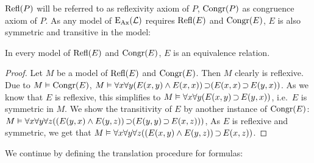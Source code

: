 $\operatorname{Refl}(P)$ will be referred to as reflexivity axiom of $P$, $\operatorname{Congr}(P)$ as congruence axiom of $P$.
As any model of $\operatorname{E_{Ax}}(\operatorname{\mathcal{L}})$ requires $\operatorname{Refl}(E)$ and $\operatorname{Congr}(E)$, $E$ is also symmetric and transitive in the model:

\begin{prop}
	\label{prop:equivalence_relation}
	In every model of $\operatorname{Refl}(E)$ and $\operatorname{Congr}(E)$,
	$E$ is an equivalence relation.
\end{prop}
\begin{proof}
	Let $M$ be a model of $\operatorname{Refl}(E)$ and $\operatorname{Congr}(E)$.
	Then $M$ clearly is reflexive.
	Due to $M \vDash \operatorname{Congr}(E)$,
	$M \entails \forall x \forall y (E(x, y) \land E(x, x)) \limpl ( E(x, x) \limpl\nolinebreak E(y, x))$.
	As we know that $E$ is reflexive, this simplifies to
	$M \entails \forall x \forall y (E(x, y)\limpl\nolinebreak E(y, x))$, i.e.~$E$ is symmetric in $M$.
	We show the transitivity of $E$ by another instance of $\operatorname{Congr}(E)$: 
	$M \entails \forall x \forall y \forall z ((E(y, x) \land E(y, z)) \limpl ( E(y, y) \limpl\nolinebreak E(x, z)))$,
	As $E$ is reflexive and symmetric, we get that 
	$M \entails \forall x \forall y \forall z ((E(x, y) \land E(y, z)) \limpl\nolinebreak E(x, z))$.
\end{proof}


We continue by defining the translation procedure for formulas:


